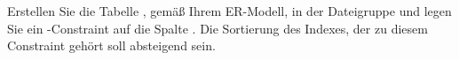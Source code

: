 \item Erstellen Sie die Tabelle , gemäß Ihrem ER-Modell,
in der Dateigruppe  und legen Sie ein \UNIQUE-Constraint auf
die Spalte . Die Sortierung des Indexes, der zu diesem
Constraint gehört soll absteigend sein.
